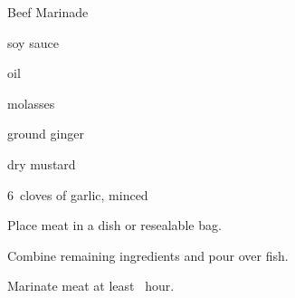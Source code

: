 \begin{recipe}{Beef Marinade}{}{}

\begin{ingredients}
 
\item \C{\half} soy sauce
\item \C{\quarter} oil
\item {} molasses
\item {} ground ginger
\item {} dry mustard
\item 6~cloves of garlic, minced
\end{ingredients}

\begin{directions}
\item Place meat in a dish or resealable bag.
\item Combine remaining ingredients and pour over fish.
\item Marinate meat at least \half~hour.
\end{directions}

\end{recipe}
